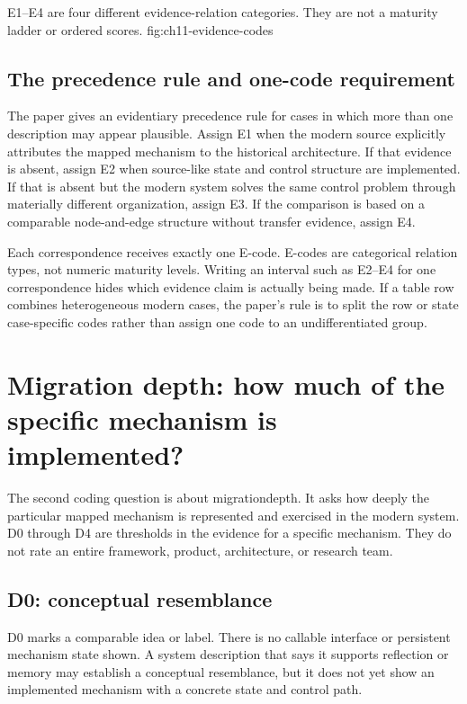   {E1--E4 are four different evidence-relation categories. They are not a maturity ladder or ordered scores.}
  {fig:ch11-evidence-codes}

\subsection{The precedence rule and one-code requirement}

The paper gives an evidentiary precedence rule for cases in which more than one description may appear plausible. Assign E1 when the modern source explicitly attributes the mapped mechanism to the historical architecture. If that evidence is absent, assign E2 when source-like state and control structure are implemented. If that is absent but the modern system solves the same control problem through materially different organization, assign E3. If the comparison is based on a comparable node-and-edge structure without transfer evidence, assign E4.

Each correspondence receives exactly one E-code. E-codes are categorical relation types, not numeric maturity levels. Writing an interval such as E2--E4 for one correspondence hides which evidence claim is actually being made. If a table row combines heterogeneous modern cases, the paper's rule is to split the row or state case-specific codes rather than assign one code to an undifferentiated group.

\section{Migration depth: how much of the specific mechanism is implemented?}
\label{sec:ch11-migration-depth}

The second coding question is about \gls{migrationdepth}. It asks how deeply the particular mapped mechanism is represented and exercised in the modern system. D0 through D4 are thresholds in the evidence for a specific mechanism. They do not rate an entire framework, product, architecture, or research team.

\subsection{D0: conceptual resemblance}

D0 marks a comparable idea or label. There is no callable interface or persistent mechanism state shown. A system description that says it supports reflection or memory may establish a conceptual resemblance, but it does not yet show an implemented mechanism with a concrete state and control path.

